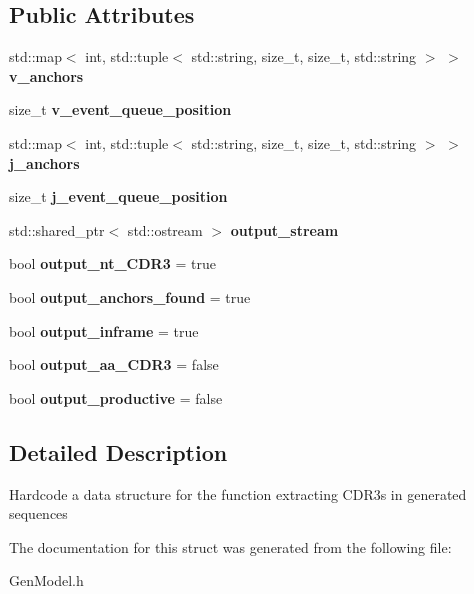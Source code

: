 \subsection*{Public Attributes}
\begin{DoxyCompactItemize}
\item 
\mbox{\label{structgen__CDR3__data_a7f92109048f58a87470b73caacebde6d}} 
std\+::map$<$ int, std\+::tuple$<$ std\+::string, size\+\_\+t, size\+\_\+t, std\+::string $>$ $>$ {\bfseries v\+\_\+anchors}
\item 
\mbox{\label{structgen__CDR3__data_ac3afce3cadecec66b19eaa8fe7cd02e0}} 
size\+\_\+t {\bfseries v\+\_\+event\+\_\+queue\+\_\+position}
\item 
\mbox{\label{structgen__CDR3__data_a74593eab758b80924d97f46ec9946157}} 
std\+::map$<$ int, std\+::tuple$<$ std\+::string, size\+\_\+t, size\+\_\+t, std\+::string $>$ $>$ {\bfseries j\+\_\+anchors}
\item 
\mbox{\label{structgen__CDR3__data_af902c78f5810850245e5afcb0e9d183e}} 
size\+\_\+t {\bfseries j\+\_\+event\+\_\+queue\+\_\+position}
\item 
\mbox{\label{structgen__CDR3__data_aaa951daedffb5700881229b510c9b39f}} 
std\+::shared\+\_\+ptr$<$ std\+::ostream $>$ {\bfseries output\+\_\+stream}
\item 
\mbox{\label{structgen__CDR3__data_acde307f0050ad91e75bd9b63a6252c5e}} 
bool {\bfseries output\+\_\+nt\+\_\+\+C\+D\+R3} = true
\item 
\mbox{\label{structgen__CDR3__data_a0fb27bb73315b9c76d20171fa21d2f7e}} 
bool {\bfseries output\+\_\+anchors\+\_\+found} = true
\item 
\mbox{\label{structgen__CDR3__data_aa6fb61bcdef0cf0f386cc83bba01e69a}} 
bool {\bfseries output\+\_\+inframe} = true
\item 
\mbox{\label{structgen__CDR3__data_aa42f2dd27ef5f7f7ae14391197f4af1c}} 
bool {\bfseries output\+\_\+aa\+\_\+\+C\+D\+R3} = false
\item 
\mbox{\label{structgen__CDR3__data_a469689d75e4111ac6a9aa5c57a3ee67d}} 
bool {\bfseries output\+\_\+productive} = false
\end{DoxyCompactItemize}


\subsection{Detailed Description}
Hardcode a data structure for the function extracting C\+D\+R3s in generated sequences 

The documentation for this struct was generated from the following file\+:\begin{DoxyCompactItemize}
\item 
Gen\+Model.\+h\end{DoxyCompactItemize}
